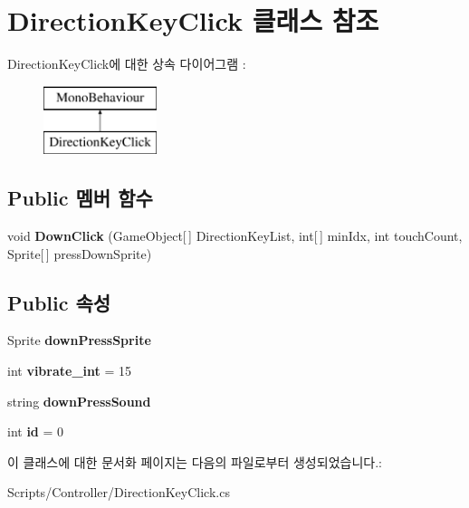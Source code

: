 \hypertarget{class_direction_key_click}{}\section{Direction\+Key\+Click 클래스 참조}
\label{class_direction_key_click}
Direction\+Key\+Click에 대한 상속 다이어그램 \+: \begin{figure}[H]
\begin{center}
\leavevmode
\includegraphics[height=2.000000cm]{class_direction_key_click}
\end{center}
\end{figure}
\subsection*{Public 멤버 함수}
\begin{DoxyCompactItemize}
\item 
\hypertarget{class_direction_key_click_a2a2ac6478aefec9bbb794e61fe548e2d}{}void {\bfseries Down\+Click} (Game\+Object\mbox{[}$\,$\mbox{]} Direction\+Key\+List, int\mbox{[}$\,$\mbox{]} min\+Idx, int touch\+Count, Sprite\mbox{[}$\,$\mbox{]} press\+Down\+Sprite)\label{class_direction_key_click_a2a2ac6478aefec9bbb794e61fe548e2d}

\end{DoxyCompactItemize}
\subsection*{Public 속성}
\begin{DoxyCompactItemize}
\item 
\hypertarget{class_direction_key_click_a787c7dfe720ee86d820011371bc83e2f}{}Sprite {\bfseries down\+Press\+Sprite}\label{class_direction_key_click_a787c7dfe720ee86d820011371bc83e2f}

\item 
\hypertarget{class_direction_key_click_ade1220b81a0de4ca8a8d61bca87deb74}{}int {\bfseries vibrate\+\_\+int} = 15\label{class_direction_key_click_ade1220b81a0de4ca8a8d61bca87deb74}

\item 
\hypertarget{class_direction_key_click_a404f6b7b957ce75421ebcbf93bbc60b2}{}string {\bfseries down\+Press\+Sound}\label{class_direction_key_click_a404f6b7b957ce75421ebcbf93bbc60b2}

\item 
\hypertarget{class_direction_key_click_a3924c20fb7c7f1e60908e992cebf9248}{}int {\bfseries id} = 0\label{class_direction_key_click_a3924c20fb7c7f1e60908e992cebf9248}

\end{DoxyCompactItemize}


이 클래스에 대한 문서화 페이지는 다음의 파일로부터 생성되었습니다.\+:\begin{DoxyCompactItemize}
\item 
Scripts/\+Controller/Direction\+Key\+Click.\+cs\end{DoxyCompactItemize}

